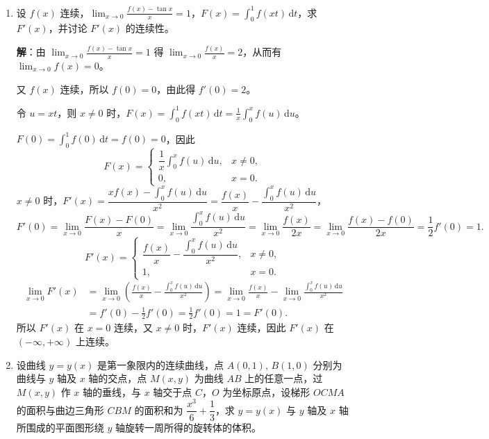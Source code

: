 \documentclass[a4paper,11pt]{ctexart}
\newcommand{\dd}{\,\mathrm{d}}
\begin{document}
\begin{enumerate}[label=\arabic*., start=17, leftmargin=2em, itemsep=0.9em, topsep=0.45em]
  \item 设 $f(x)$ 连续，$\displaystyle\lim_{x\to 0}\frac{f(x)-\tan x}{x}=1$，$F(x)=\displaystyle\int_0^1 f(xt)\dd t$，求 $F'(x)$，并讨论 $F'(x)$ 的连续性。

  \textbf{解}：由 $\displaystyle\lim_{x\to 0}\frac{f(x)-\tan x}{x}=1$ 得 $\displaystyle\lim_{x\to 0}\frac{f(x)}{x}=2$，从而有 $\displaystyle\lim_{x\to 0}f(x)=0$。

  又 $f(x)$ 连续，所以 $f(0)=0$，由此得 $f'(0)=2$。

  令 $u=xt$，则 $x\neq 0$ 时，$F(x)=\displaystyle\int_0^1 f(xt)\dd t=\frac{1}{x}\int_0^x f(u)\dd u$。

  $F(0)=\displaystyle\int_0^1 f(0)\dd t=f(0)=0$，因此
  \[
    F(x)=\begin{cases}\dfrac{1}{x}\displaystyle\int_0^x f(u)\dd u, & x\neq 0,\\[0.5em] 0, & x=0.\end{cases}
  \]
  $x\neq 0$ 时，$F'(x)=\dfrac{xf(x)-\displaystyle\int_0^x f(u)\dd u}{x^2}=\dfrac{f(x)}{x}-\dfrac{\displaystyle\int_0^x f(u)\dd u}{x^2}$，
  \[
    F'(0)=\lim_{x\to 0}\frac{F(x)-F(0)}{x}
    =\lim_{x\to 0}\frac{\displaystyle\int_0^x f(u)\dd u}{x^2}
    =\lim_{x\to 0}\frac{f(x)}{2x}
    =\lim_{x\to 0}\frac{f(x)-f(0)}{2x}
    =\frac{1}{2}f'(0)=1.
  \]
  \[
    F'(x)=\begin{cases}\dfrac{f(x)}{x}-\dfrac{\displaystyle\int_0^x f(u)\dd u}{x^2}, & x\neq 0,\\[0.8em] 1, & x=0.\end{cases}
  \]
  \begin{align*}
    \lim_{x\to 0}F'(x)
    &=\lim_{x\to 0}\left(\frac{f(x)}{x}-\frac{\displaystyle\int_0^x f(u)\dd u}{x^2}\right)
    =\lim_{x\to 0}\frac{f(x)}{x}-\lim_{x\to 0}\frac{\displaystyle\int_0^x f(u)\dd u}{x^2} \\
    &=f'(0)-\frac{1}{2}f'(0)=\frac{1}{2}f'(0)=1=F'(0).
  \end{align*}
  所以 $F'(x)$ 在 $x=0$ 连续，又 $x\neq 0$ 时，$F'(x)$ 连续，因此 $F'(x)$ 在 $(-\infty,+\infty)$ 上连续。

  \item 设曲线 $y=y(x)$ 是第一象限内的连续曲线，点 $A(0,1),\,B(1,0)$ 分别为曲线与 $y$ 轴及 $x$ 轴的交点，点 $M(x,y)$ 为曲线 $AB$ 上的任意一点，过 $M(x,y)$ 作 $x$ 轴的垂线，与 $x$ 轴交于点 $C$，$O$ 为坐标原点，设梯形 $OCMA$ 的面积与曲边三角形 $CBM$ 的面积和为 $\dfrac{x^3}{6}+\dfrac{1}{3}$，求 $y=y(x)$ 与 $y$ 轴及 $x$ 轴所围成的平面图形绕 $y$ 轴旋转一周所得的旋转体的体积。


\end{enumerate}
\end{document}
